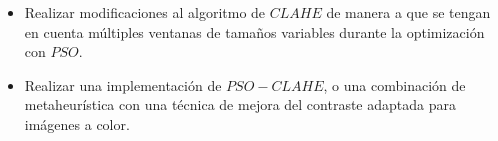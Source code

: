 \documentclass[a0,landscape,spanish]{a0poster}
\begin{document}
\begin{multicols}{3}
\begin{itemize}

\item Realizar modificaciones al algoritmo de $CLAHE$ de manera a que se tengan en cuenta múltiples ventanas de tamaños variables durante la optimización con $PSO$.

\item Realizar una implementación de $PSO-CLAHE$, o una combinación de metaheurística con una técnica de mejora del contraste adaptada para imágenes a color.
\end{itemize} 












\end{multicols}
\end{document}
